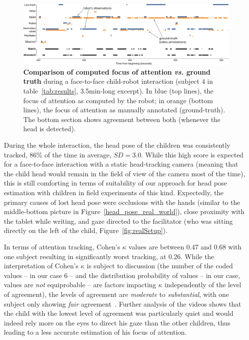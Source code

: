 \documentclass{sig-alternate}
\newcommand{\vs}{\textit{vs.}\xspace}
\begin{document}
\begin{figure}[ht!]
    \centering
    \includegraphics[width=\linewidth]{matches-excerpt}
    \caption{\small \textbf{Comparison of computed focus of attention \vs ground
        truth} during a face-to-face child-robot interaction (subject 4
        in table~\ref{tab:results}, 3.5min-long excerpt).
        In blue (top lines), the focus of attention as computed by the robot;
        in orange (bottom lines), the focus of attention as manually annotated
        (ground-truth). The bottom section shows agreement between both (whenever
        the head is detected).}

    \label{fig:realExpected}
    
\end{figure}


During the whole interaction, the head pose of the children was consistently
tracked, 86\% of the time in average, $SD=3.0$. While this high score is
expected for a face-to-face interaction with a static head-tracking camera
(meaning that the child head would remain in the field of view of the camera
most of the time), this is still comforting in terms of suitability of our
approach for head pose estimation with children in field experiments of this
kind. Expectedly, the primary causes of lost head pose were occlusions with the
hands (similar to the middle-bottom picture in
Figure~\ref{head_pose_real_world}), close proximity with the tablet while
writing, and gaze directed to the facilitator (who was sitting directly on the
left of the child, Figure~\ref{fig:realSetup}).

In terms of attention tracking, Cohen's $\kappa$ values are between 0.47 and
0.68 with one subject resulting in significantly worst tracking, at 0.26. While
the interpretation of Cohen's $\kappa$ is subject to discussion (the number of
the coded values -- in our case 6 -- and the distribution probability of values
-- in our case, values are \emph{not} equiprobable -- are factors impacting
$\kappa$ independently of the level of agreement), the levels of agreement are
\emph{moderate} to \emph{substantial}, with one subject only showing \emph{fair}
agreement~\cite{landis1977measurement}. Further analysis of the videos shows
that the child with the lowest level of agreement was particularly quiet and
would indeed rely more on the eyes to direct his gaze than the other children,
thus leading to a less accurate estimation of his focus of attention.
\end{document}

